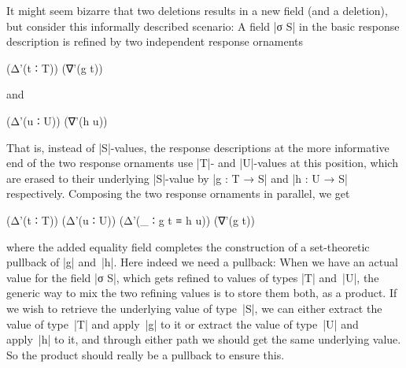 \begin{itemize}
It might seem bizarre that two deletions results in a new field (and a deletion), but consider this informally described scenario:
A field |σ S| in the basic response description is refined by two independent response ornaments
\savecolumns
\begin{code}
(Δ'(t ∶ T))  (∇'(g t))
\end{code}
and
\restorecolumns
\begin{code}
(Δ'(u ∶ U))  (∇'(h u))
\end{code}
That is, instead of |S|-values, the response descriptions at the more informative end of the two response ornaments use |T|- and |U|-values at this position, which are erased to their underlying |S|-value by |g : T → S| and |h : U → S| respectively.
Composing the two response ornaments in parallel, we get
\begin{code}
(Δ'(t ∶ T)) (Δ'(u ∶ U)) (Δ'(_ ∶ g t ≡ h u)) (∇'(g t))
\end{code}
where the added equality field completes the construction of a set-theoretic pullback of |g| and~|h|.
Here indeed we need a pullback:
When we have an actual value for the field |σ S|, which gets refined to values of types |T| and~|U|, the generic way to mix the two refining values is to store them both, as a product. If we wish to retrieve the underlying value of type~|S|, we can either extract the value of type~|T| and apply~|g| to it or extract the value of type~|U| and apply~|h| to it, and through either path we should get the same underlying value.
So the product should really be a pullback to ensure this.
\end{itemize}


